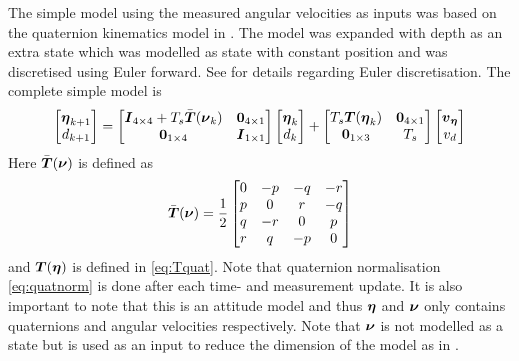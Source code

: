 The simple model using the measured angular velocities as inputs was based on the quaternion kinematics model in \citet[p. 47]{Tornqvist}. The model was expanded with depth as an extra state which was modelled as state with constant position and was discretised using Euler forward. See \citet[p. 378]{modellbygge} for details regarding Euler discretisation. The complete simple model is 
\begin{equation}
\begin{bmatrix}
\boldsymbol{\eta}_{k+1}\\
d_{k+1}
\end{bmatrix} 
=
 \begin{bmatrix}
 \boldsymbol{I}_{4\times4} + T_s \bar{\boldsymbol{T}}(\boldsymbol{\nu}_k) & \boldsymbol{0}_{4\times1}\\
 \boldsymbol{0}_{1\times4} & \boldsymbol{I}_{1\times1} 
 \end{bmatrix}
 \begin{bmatrix}
 \boldsymbol{\eta}_{k}\\
 d_k
 \end{bmatrix}
 +
  \begin{bmatrix}
  T_s \boldsymbol{T}(\boldsymbol{\eta}_{k}) & \boldsymbol{0}_{4\times1}\\
  \boldsymbol{0}_{1\times3} & T_s
  \end{bmatrix}
  \begin{bmatrix}
  \boldsymbol{v}_{\boldsymbol{\eta}}\\
  v_d 
  \end{bmatrix}
\end{equation}
Here $\bar{\boldsymbol{T}}(\boldsymbol{\nu})$ is defined as
\begin{equation}
\bar{\boldsymbol{T}}(\boldsymbol{\nu}) = \frac{1}{2}
\begin{bmatrix}
     0 &-p &-q &-r\\
     p & 0 & r &-q\\
     q &-r & 0 & p\\
     r & q &-p & 0
\end{bmatrix}
\end{equation} and $\boldsymbol{T}(\boldsymbol{\eta})$ is defined in \eqref{eq:Tquat}. Note that quaternion normalisation \eqref{eq:quatnorm} is done after each time- and measurement update.
It is also important to note that this is an attitude model and thus $\boldsymbol{\eta}$ and $\boldsymbol{\nu}$ only contains quaternions and angular velocities respectively. Note that $\boldsymbol{\nu}$ is not modelled as a state but is used as an input to reduce the dimension of the model as in \citet{Tornqvist}. 

